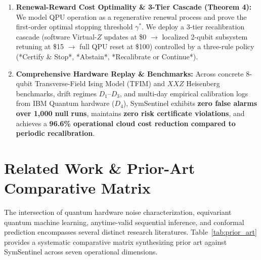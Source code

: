 \documentclass[aps,pra,twocolumn,superscriptaddress,10pt,floatfix]{revtex4-2}
\begin{document}
\begin{enumerate}
    \item \textbf{Renewal-Reward Cost Optimality \& 3-Tier Cascade (Theorem 4):} We model QPU operation as a regenerative renewal process and prove the first-order optimal stopping threshold $\gamma^*$. We deploy a 3-tier recalibration cascade (software Virtual-$Z$ updates at \$0 $\to$ localized 2-qubit subsystem retuning at \$15 $\to$ full QPU reset at \$100) controlled by a three-rule policy (*Certify \& Stop*, *Abstain*, *Recalibrate or Continue*).
    \item \textbf{Comprehensive Hardware Replay \& Benchmarks:} Across concrete 8-qubit Transverse-Field Ising Model (TFIM) and $XXZ$ Heisenberg benchmarks, drift regimes $D_1$--$D_3$, and multi-day empirical calibration logs from IBM Quantum hardware ($D_4$), SymSentinel exhibits \textbf{zero false alarms over 1,000 null runs}, maintains \textbf{zero risk certificate violations}, and achieves a \textbf{96.6\% operational cloud cost reduction compared to periodic recalibration}.
\end{enumerate}

\section{Related Work \& Prior-Art Comparative Matrix}
\label{sec:related_work}
The intersection of quantum hardware noise characterization, equivariant quantum machine learning, anytime-valid sequential inference, and conformal prediction encompasses several distinct research literatures. Table~\ref{tab:prior_art} provides a systematic comparative matrix synthesizing prior art against SymSentinel across seven operational dimensions.
\end{document}
